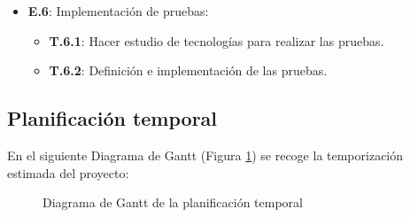 \begin{itemize}
    \item \textbf{E.6}: Implementación de pruebas:
    \begin{itemize}
        \item \textbf{T.6.1}: Hacer estudio de tecnologías para realizar las pruebas.
        \item \textbf{T.6.2}: Definición e implementación de las pruebas.
    \end{itemize}   

\end{itemize}

\subsection{Planificación temporal}
En el siguiente Diagrama de Gantt (Figura \ref{fig:gantt}) se recoge la temporización estimada del proyecto:

\begin{figure}[H]
    \caption{Diagrama de Gantt de la planificación temporal}
    \label{fig:gantt}
\end{figure}


